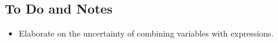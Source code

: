 \documentclass[titlepage,11pt]{article}
\begin{document}
\subsection{To Do and Notes}

\begin{itemize}
\item Elaborate on the uncertainty of combining variables with expressions.
\end{itemize}
\end{document}
